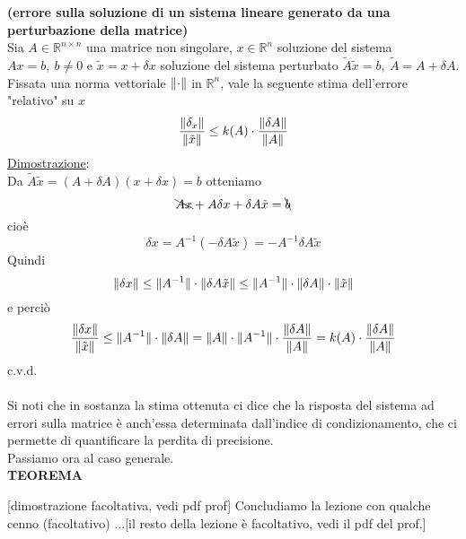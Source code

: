 \documentclass[12pt,a4paper]{article}
\DeclarePairedDelimiter{\norma}{\lVert}{\rVert}
\begin{document}
\textbf{ (errore sulla soluzione di un sistema lineare generato da una perturbazione della matrice)}\\
Sia $A \in \mathbb{R}^{n \times n}$ una matrice non singolare, $x \in \mathbb{R}^n$ soluzione del sistema $Ax = b, \ b \neq 0$ e $\tilde{x} = x + \delta x$ soluzione del sistema perturbato $\tilde{A} \tilde{x} = b, \ \tilde{A} = A + \delta A$.\\
Fissata una norma vettoriale $\norma{\cdot}$ in $\mathbb{R}^n$, vale la seguente stima dell'errore "relativo" su $x$
\[
\frac{\norma{\delta_x}}{\norma{\tilde{x}}} \le k(A) \cdot \frac{\norma{\delta A}}{\norma{A}}
\]
\underline{Dimostrazione}:\\
Da $\tilde{A} \tilde{x} = (A + \delta A)(x + \delta x) = b$ otteniamo
\[
\bcancel{Ax} + A\delta x + \delta A \tilde{x} = \bcancel{b}
\]
cioè
\[
\delta x = A^{-1} (-\delta A \tilde{x}) = -A^{-1} \delta A\tilde{x}
\]
Quindi
\[
\norma{\delta x} \le \norma{A^{-1}} \cdot \norma{\delta A \tilde{x}} \le \norma{A^{-1}} \cdot \norma{\delta A} \cdot \norma{\tilde{x}}
\]
e perciò
\[
\frac{\norma{\delta x}}{\norma{\tilde{x}}} \le \norma{A^{-1}} \cdot \norma{\delta A} = \norma{A} \cdot \norma{A^{-1}} \cdot \frac{\norma{\delta A}}{\norma{A}} = k(A) \cdot \frac{\norma{\delta A}}{\norma{A}}
\]
c.v.d.\\\\
Si noti che in sostanza la stima ottenuta ci dice che la risposta del sistema ad errori sulla matrice è anch'essa determinata dall'indice di condizionamento, che ci permette di quantificare la perdita di precisione.\\
Passiamo ora al caso generale.\\
\textbf{TEOREMA}
\begin{center}
\end{center}
[dimostrazione facoltativa, vedi pdf prof]
Concludiamo la lezione con qualche cenno (facoltativo) $\dotso$[il resto della lezione è facoltativo, vedi il pdf del prof.]
\end{document}

